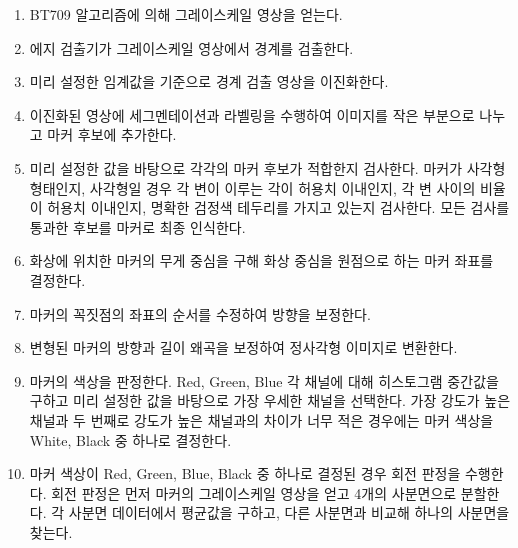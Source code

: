 \documentclass[chapter,11pt,oneside,openany]{xoblivoir}
\begin{document}
\begin{enumerate}

\item BT709 알고리즘에 의해 그레이스케일 영상을 얻는다.

\item 에지 검출기가 그레이스케일 영상에서 경계를 검출한다.

\item 미리 설정한 임계값을 기준으로 경계 검출 영상을 이진화한다.

\item 이진화된 영상에 세그멘테이션과 라벨링을 수행하여 이미지를 작은 부분으로 나누고 마커 후보에 추가한다.

\item 미리 설정한 값을 바탕으로 각각의 마커 후보가 적합한지 검사한다.
마커가 사각형 형태인지, 사각형일 경우 각 변이 이루는 각이 허용치 이내인지,
각 변 사이의 비율이 허용치 이내인지, 명확한 검정색 테두리를 가지고 있는지 검사한다.
모든 검사를 통과한 후보를 마커로 최종 인식한다.

\item 화상에 위치한 마커의 무게 중심을 구해 화상 중심을 원점으로 하는 마커 좌표를 결정한다.

\item 마커의 꼭짓점의 좌표의 순서를 수정하여 방향을 보정한다.

\item 변형된 마커의 방향과 길이 왜곡을 보정하여 정사각형 이미지로 변환한다.

\item 마커의 색상을 판정한다. Red, Green, Blue 각 채널에 대해 히스토그램 중간값을 구하고
미리 설정한 값을 바탕으로 가장 우세한 채널을 선택한다.
가장 강도가 높은 채널과 두 번째로 강도가 높은 채널과의 차이가 너무 적은 경우에는
마커 색상을 White, Black 중 하나로 결정한다.

\item 마커 색상이 Red, Green, Blue, Black 중 하나로 결정된 경우 회전 판정을 수행한다.
회전 판정은 먼저 마커의 그레이스케일 영상을 얻고 4개의 사분면으로 분할한다.
각 사분면 데이터에서 평균값을 구하고, 다른 사분면과 비교해 하나의 사분면을 찾는다.

\end{enumerate}
\end{document}
